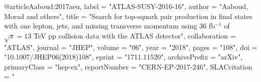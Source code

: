 

@article{Aaboud:2017aeu,
      label          = "ATLAS-SUSY-2016-16",
      author         = "Aaboud, Morad and others",
      title          = "{Search for top-squark pair production in final states
                        with one lepton, jets, and missing transverse momentum
                        using 36 fb$^{-1}$ of $ \sqrt{s}=13 $ TeV pp collision
                        data with the ATLAS detector}",
      collaboration  = "ATLAS",
      journal        = "JHEP",
      volume         = "06",
      year           = "2018",
      pages          = "108",
      doi            = "10.1007/JHEP06(2018)108",
      eprint         = "1711.11520",
      archivePrefix  = "arXiv",
      primaryClass   = "hep-ex",
      reportNumber   = "CERN-EP-2017-246",
      SLACcitation   = "%
}

